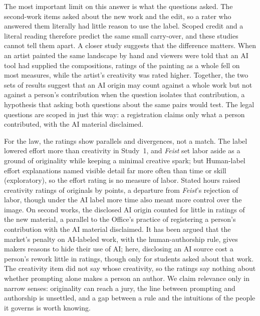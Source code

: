 The most important limit on this answer is what the questions asked. The second-work items asked about the new work and the edit, so a rater who answered them literally had little reason to use the label. Scoped credit and a literal reading therefore predict the same small carry-over, and these studies cannot tell them apart. A closer study suggests that the difference matters. When an artist painted the same landscape by hand and viewers were told that an AI tool had supplied the compositions, ratings of the painting as a whole fell on most measures, while the artist's creativity was rated higher.\cite{messer2024cocreating} Together, the two sets of results suggest that an AI origin may count against a whole work but not against a person's contribution when the question isolates that contribution, a hypothesis that asking both questions about the same pairs would test. The legal questions are scoped in just this way: a registration claims only what a person contributed, with the AI material disclaimed.\cite{usco2023guidance}

For the law, the ratings show parallels and divergences, not a match. The label lowered effort more than creativity in Study~1, and \emph{Feist} set labor aside as a ground of originality while keeping a minimal creative spark;\cite{feist1991rural} but Human-label effort explanations named visible detail far more often than time or skill (exploratory), so the effort rating is no measure of labor. Stated hours raised creativity ratings of originals by \SThreeCreatTimeContrastEst{} points, a departure from \emph{Feist}'s rejection of labor, though under the AI label more time also meant more control over the image. On second works, the disclosed AI origin counted for little in ratings of the new material, a parallel to the Office's practice of registering a person's contribution with the AI material disclaimed. It has been argued that the market's penalty on AI-labeled work, with the human-authorship rule, gives makers reasons to hide their use of AI;\cite{notivictor2025hidden} here, disclosing an AI source cost a person's rework little in ratings, though only for students asked about that work. The creativity item did not say whose creativity, so the ratings say nothing about whether prompting alone makes a person an author. We claim relevance only in narrow senses: originality can reach a jury,\cite{eleventhcircuit2025pattern} the line between prompting and authorship is unsettled, and a gap between a rule and the intuitions of the people it governs is worth knowing.

